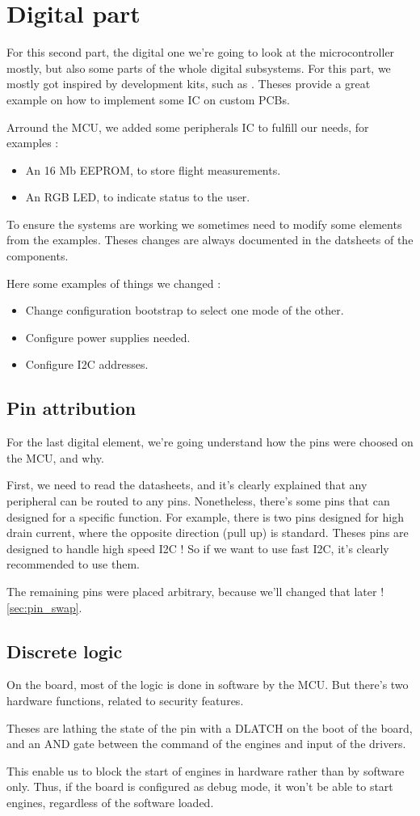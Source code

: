 \section{Digital part}
For this second part, the digital one we're going to look at the microcontroller mostly,
but also some parts of the whole digital subsystems. For this part, we mostly got inspired
by development kits, such as \cite{nRF5340DK}. Theses provide a great example on how to 
implement some IC on custom PCBs. 

Arround the MCU, we added some peripherals IC to fulfill our needs, for examples :
\begin{itemize}[noitemsep]
    \item An 16 Mb EEPROM, to store flight measurements.
    \item An RGB LED, to indicate status to the user.
\end{itemize}

To ensure the systems are working we sometimes need to modify some elements from the examples.
Theses changes are always documented in the datsheets of the components.

Here some examples of things we changed :
\begin{itemize}[noitemsep]
    \item   Change configuration bootstrap to select one mode of the other.
    \item   Configure power supplies needed.
    \item   Configure I2C addresses.
\end{itemize}

\subsection{Pin attribution}
For the last digital element, we're going understand how the pins were choosed on the MCU, and why.

First, we need to read the datasheets, and it's clearly explained that any peripheral can be routed to 
any pins.
Nonetheless, there's some pins that can designed for a specific function. For example, there is two pins
designed for high drain current, where the opposite direction (pull up) is standard. Theses pins are 
designed to handle high speed I2C ! So if we want to use fast I2C, it's clearly recommended to use them.

The remaining pins were placed arbitrary, because we'll changed that later ! \ref{sec:pin_swap}.

\subsection{Discrete logic}\label{subsec:dis_logic}
On the board, most of the logic is done in software by the MCU. But there's two hardware functions, related
to security features.

Theses are lathing the state of the pin with a DLATCH on the boot of the board, and an AND gate between the 
command of the engines and input of the drivers.

This enable us to block the start of engines in hardware rather than by software only. Thus, if the board 
is configured as debug mode, it won't be able to start engines, regardless of the software loaded.
